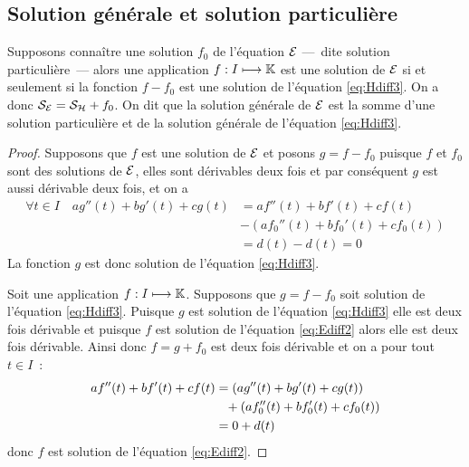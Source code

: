\subsection{Solution générale et solution particulière}
\label{subsec:solutiongeneraleetsolutionpart}
\begin{theo}
Supposons connaître une solution \(f_0\) de l'équation \(\mathcal{E}\) ---~dite solution particulière~--- alors une application \(f:I \longmapsto \mathbb{K}\) est une solution de \(\mathcal{E}\) si et seulement si la fonction \(f-f_0\) est une solution de l'équation \eqref{eq:Hdiff3}. On a donc \(\mathcal{S}_{\mathcal{E}}=\mathcal{S}_{\mathcal{H}} + f_0\). On dit que la solution générale de \(\mathcal{E}\) est la somme d'une solution particulière et de la solution générale de l'équation \eqref{eq:Hdiff3}.
\end{theo}
\begin{proof}
  Supposons que \(f\) est une solution de \(\mathcal{E}\) et posons \(g=f-f_0\) puisque \(f\) et \(f_0\) sont des solutions de \(\mathcal{E}\), elles sont dérivables deux fois et par conséquent \(g\) est aussi dérivable deux fois, et on a
  \begin{align}
    \forall t \in I \quad ag''(t)+bg'(t)+cg(t) &= af''(t)+bf'(t)+cf(t) \\ &- (af_0''(t)+bf_0'(t)+cf_0(t))\\ &= d(t)-d(t)=0
  \end{align}
La fonction \(g\) est donc solution de l'équation \eqref{eq:Hdiff3}.

Soit une application \(f:I \longmapsto \mathbb{K}\). Supposons que \(g=f-f_0\) soit solution de l'équation \eqref{eq:Hdiff3}. Puisque \(g\) est solution de l'équation \eqref{eq:Hdiff3} elle est deux fois dérivable et puisque \(f\) est solution de l'équation \eqref{eq:Ediff2} alors elle est deux fois dérivable. Ainsi donc \(f=g+f_0\) est deux fois dérivable et on a pour tout \(t \in I\)~:
\begin{align}
  af''(t)+bf'(t)+cf(t)&=(ag''(t)+bg'(t)+cg(t))\notag\\ &\phantom{=}+(af_0''(t)+bf_0'(t)+cf_0(t))\\ &=0+d(t) 
\end{align}
donc \(f\) est solution de l'équation \eqref{eq:Ediff2}.
\end{proof}
